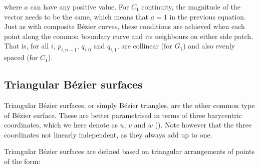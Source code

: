 where \(a\) can have any positive value.
For \(C_1\) continuity, the magnitude of the vector needs to be the same, which means that \(a = 1\) in the previous equation.
Just as with composite B\'ezier curves, these conditions are achieved when each point along the common boundary curve and its neighbours on either side patch.
That is, for all \(i\), \(p_{i, n-1}\), \(q_{i, 0}\) and \(q_{i, 1}\), are collinear (for \(G_1\)) and also evenly spaced (for \(C_1\)). 

\subsection{Triangular B\'ezier surfaces}

Triangular B\'ezier surfaces, or simply B\'ezier triangles, are the other common type of B\'ezier surface.
These are better parametrised in terms of three barycentric coordinates, which we here denote as \(u\), \(v\) and \(w\) ().
Note however that the three coordinates not linearly independent, as they always add up to one.

Triangular B\'ezier surfaces are defined based on triangular arrangements of points of the form:

